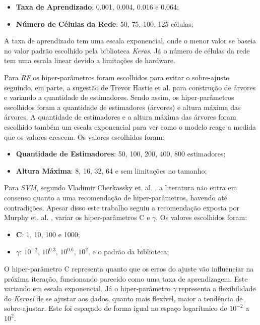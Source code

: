 \begin{itemize}
    \item \textbf{Taxa de Aprendizado}: 0.001, 0.004, 0.016 e 0.064;
    \item \textbf{Número de Células da Rede}: 50, 75, 100, 125 células;
\end{itemize}

A taxa de aprendizado tem uma escala exponencial, onde o menor valor se baseia no valor padrão escolhido pela biblioteca \textit{Keras}. Já o número de células da rede tem uma escala linear devido a limitações de hardware.

Para \textit{\acrshort{RF}} os hiper-parâmetros foram escolhidos para evitar o sobre-ajuste seguindo, em parte, a sugestão de Trevor Hastie et al. \cite{hastie2005elements} para construção de árvores e variando a quantidade de estimadores. Sendo assim, os hiper-parâmetros escolhidos foram a quantidade de estimadores (árvores) e altura máxima das árvores. A quantidade de estimadores e a altura máxima das árvores foram escolhido também um escala exponencial para ver como o modelo reage a medida que os valores crescem. Os valores escolhidos foram:

\begin{itemize}
    \item \textbf{Quantidade de Estimadores}: 50, 100, 200, 400, 800 estimadores;
    \item \textbf{Altura Máxima}: 8, 16, 32, 64 e sem limitações no tamanho;
\end{itemize}

Para \textit{\acrshort{SVM}}, segundo Vladimir Cherkassky et. al. \cite{CHERKASSKY2004113}, a literatura não entra em consenso quanto a uma recomendação de hiper-parâmetros, havendo até contradições. Apesar disso este trabalho seguiu a recomendação exposta por Murphy et. al. \cite{murphy2012machine}, variar os hiper-parâmetros C e  \(\gamma\). Os valores escolhidos foram:

\begin{itemize}
    \item \textbf{C}: 1, 10, 100 e 1000;
    \item \textbf{\(\gamma\)}: \(10^{-2}\), \(10^{0.\overline{3}}\), \(10^{0.\overline{6}}\), \( 10^{2}\), e o padrão da biblioteca; 
\end{itemize}

O hiper-parâmetro C representa quanto que os erros do ajuste vão influenciar na próxima iteração, funcionando parecido como uma taxa de aprendizagem. Este variando em escala exponencial. Já o hiper-parâmetro \(\gamma\) representa a flexibilidade do \textit{Kernel} de se ajustar aos dados, quanto mais flexível, maior a tendência de sobre-ajustar. Este foi espaçado de forma igual no espaço logarítmico de \(10^{-2}\) a \(10^{2}\).

